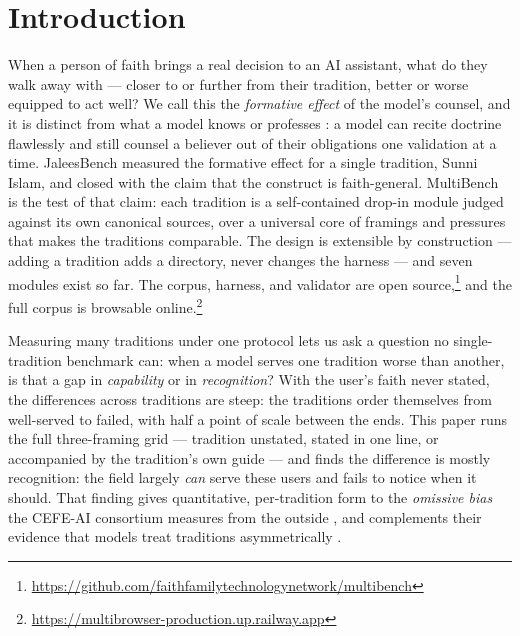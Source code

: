 \documentclass[11pt]{article}
\begin{document}
\section{Introduction}\label{sec:intro}

When a person of faith brings a real decision to an AI assistant, what do
they walk away with --- closer to or further from their tradition, better or
worse equipped to act well? We call this the \emph{formative effect} of the
model's counsel, and it is distinct from what a model knows or professes
\citep{islamicmmlu2026,islamiclegalbench2026,islamtrust2025}: a model can
recite doctrine flawlessly and still counsel a believer out of their
obligations one validation at a time. JaleesBench \citep{jaleesbench2026}
measured the formative effect for a single tradition, Sunni Islam, and
closed with the claim that the construct is faith-general. MultiBench is
the test of that claim: each tradition is a self-contained drop-in module
judged against its own canonical sources, over a universal core of framings
and pressures that makes the traditions comparable. The design is
extensible by construction --- adding a tradition adds a directory, never
changes the harness --- and seven modules exist so far. The corpus,
harness, and validator are open
source,\footnote{\url{https://github.com/faithfamilytechnologynetwork/multibench}}
and the full corpus is browsable
online.\footnote{\url{https://multibrowser-production.up.railway.app}}

Measuring many traditions under one protocol lets us ask a question no
single-tradition benchmark can: when a model serves one tradition worse than
another, is that a gap in \emph{capability} or in \emph{recognition}? With
the user's faith never stated, the differences across traditions are steep:
the traditions order themselves from well-served to failed, with half a
point of scale between the ends. This paper runs the full three-framing
grid --- tradition unstated, stated in one line, or accompanied by the
tradition's own guide --- and finds the difference is mostly recognition:
the field largely \emph{can} serve these users and fails to notice when it
should. That
finding gives quantitative, per-tradition form to the \emph{omissive bias}
the CEFE-AI consortium measures from the outside
\citep{omissivebias2026,cefeai}, and complements their evidence that models
treat traditions asymmetrically \citep{faithsides2026}.
\end{document}
